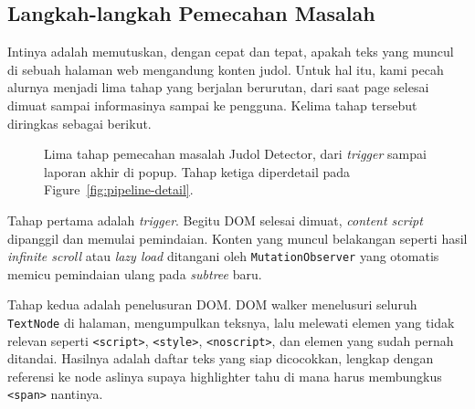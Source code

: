 \documentclass[11pt,a4paper]{article}
\begin{document}
\subsection{Langkah-langkah Pemecahan Masalah}

Intinya adalah memutuskan, dengan cepat dan tepat, apakah teks yang muncul di sebuah halaman web mengandung konten judol.
Untuk hal itu, kami pecah alurnya menjadi lima tahap yang berjalan berurutan, dari saat page selesai dimuat sampai
informasinya sampai ke pengguna. Kelima tahap tersebut diringkas sebagai berikut.

\begin{figure}[H]
    \centering
    \caption{Lima tahap pemecahan masalah Judol Detector, dari \textit{trigger} sampai laporan akhir di popup. Tahap ketiga
    diperdetail pada Figure~\ref{fig:pipeline-detail}.}
    \label{fig:problem-flow}
\end{figure}

Tahap pertama adalah \textit{trigger}. Begitu DOM selesai dimuat, \textit{content script} dipanggil dan memulai pemindaian.
Konten yang muncul belakangan seperti hasil \textit{infinite scroll} atau \textit{lazy load} ditangani oleh
\texttt{MutationObserver} yang otomatis memicu pemindaian ulang pada \textit{subtree} baru.

Tahap kedua adalah penelusuran DOM. DOM walker menelusuri seluruh \texttt{TextNode} di halaman, mengumpulkan teksnya, lalu
melewati elemen yang tidak relevan seperti \texttt{<script>}, \texttt{<style>}, \texttt{<noscript>}, dan elemen yang sudah pernah
ditandai. Hasilnya adalah daftar teks yang siap dicocokkan, lengkap dengan referensi ke node aslinya supaya highlighter tahu di
mana harus membungkus \texttt{<span>} nantinya.
\end{document}
